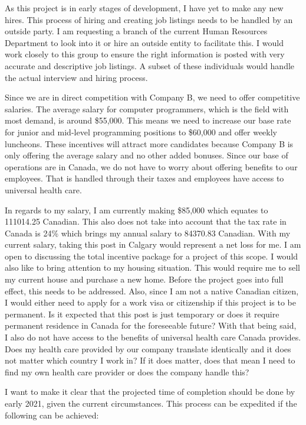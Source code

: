 \documentclass{article}
\begin{document}
As this project is in early stages of development, I have yet to make any new hires.
This process of hiring and creating job listings needs to be handled by an outside party.
I am requesting a branch of the current Human Resources Department to look into it or hire an outside entity to facilitate this.
I would work closely to this group to ensure the right information is posted with very accurate and descriptive job listings.
A subset of these individuals would handle the actual interview and hiring process.

Since we are in direct competition with Company B, we need to offer competitive salaries.
The average salary for computer programmers, which is the field with most demand, is around \$55,000.
This means we need to increase our base rate for junior and mid-level programming positions to \$60,000 and offer weekly luncheons.
These incentives will attract more candidates because Company B is only offering the average salary and no other added bonuses.
Since our base of operations are in Canada, we do not have to worry about offering benefits to our employees.
That is handled through their taxes and employees have access to universal health care.

In regards to my salary, I am currently making \$85,000 which equates to 111014.25 Canadian.
This also does not take into account that the tax rate in Canada is 24\% which brings my annual salary to 84370.83 Canadian.
With my current salary, taking this post in Calgary would represent a net loss for me. I am open to discussing the total incentive package for a project of this scope.
I would also like to bring attention to my housing situation.
This would require me to sell my current house and purchase a new home.
Before the project goes into full effect, this needs to be addressed.
Also, since I am not a native Canadian citizen, I would either need to apply for a work visa or citizenship if this project is to be permanent.
Is it expected that this post is just temporary or does it require permanent residence in Canada for the foreseeable future?
With that being said, I also do not have access to the benefits of universal health care Canada provides.
Does my health care provided by our company translate identically and it does not matter which country I work in?
If it does matter, does that mean I need to find my own health care provider or does the company handle this?

I want to make it clear that the projected time of completion should be done by early 2021, given the current circumstances.
This process can be expedited if the following can be achieved:
\end{document}
